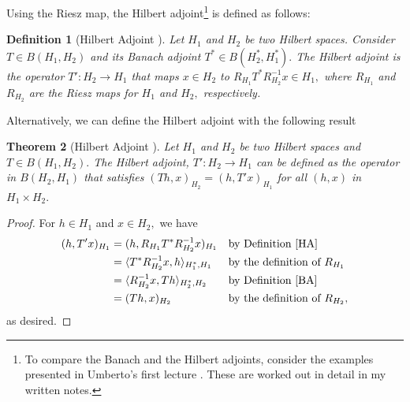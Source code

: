 \documentclass[12pt,a4paper]{article}
\theoremstyle{boldthm}
\newtheorem{theorem}{Theorem}[section]
\theoremstyle{bolddefn}
\newtheorem{definition}[theorem]{Definition}
\begin{document}
Using the Riesz map, the Hilbert adjoint\footnote{To compare the Banach and the Hilbert adjoints, consider the examples presented in Umberto's first lecture \cite{umberto}. These are worked out in detail in my written notes.} is defined as follows:
\begin{definition}[Hilbert Adjoint \cite{umberto}] \label{HA}
    Let $H_1$ and $H_2$ be two Hilbert spaces. Consider $T \in B(H_1, H_2)$ and its Banach adjoint $T^* \in B(H_2^*, H_1^*).$ The Hilbert adjoint is the operator $T' : H_2 \rightarrow H_1$ that maps $x \in H_2$  to $R_{H_1} T^* R_{H_2}^{-1} x \in H_1,$ where $R_{H_1}$ and $R_{H_2}$ are the Riesz maps for $H_1$ and $H_2,$ respectively.
\end{definition}
Alternatively, we can define the Hilbert adjoint with the following result
\begin{theorem} [Hilbert Adjoint \cite{umberto}] 
     Let $H_1$ and $H_2$ be two Hilbert spaces and $T \in B(H_1, H_2).$ The Hilbert adjoint, $T' : H_2 \rightarrow H_1$ can be defined as the operator in $B(H_2, H_1)$ that satisfies $(Th, x)_{H_2} = (h, T'x)_{H_1}$ for all $(h, x)$ in $H_1 \times H_2.$
\end{theorem}
\begin{proof}
    For $h \in H_1$ and $x \in H_2,$ we have
    \begin{equation}
    \begin{aligned}
        (h,T'x)_{H_1}
        &= (h,R_{H_1}T^*R_{H_2}^{-1}x)_{H_1}
        && \text{by Definition \ref{HA}} \\
        &= \langle T^*R_{H_2}^{-1}x,h\rangle_{H_1^*,H_1}
        && \text{by the definition of } R_{H_1} \\
        &= \langle R_{H_2}^{-1}x,Th\rangle_{H_2^*,H_2}
        && \text{by Definition \ref{BA}} \\
        &= (Th,x)_{H_2}
        && \text{by the definition of } R_{H_2},
    \end{aligned}
    \end{equation}
as desired.
\end{proof}
\end{document}
